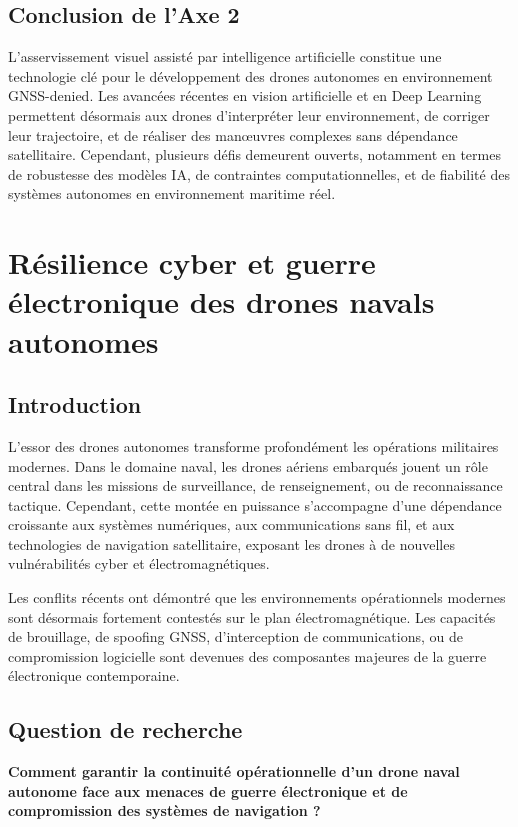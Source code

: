 \documentclass[12pt, a4paper, twoside, openright]{report}
\begin{document}
\section{Conclusion de l'Axe 2}
L’asservissement visuel assisté par intelligence artificielle constitue une technologie clé pour le développement des drones autonomes en environnement GNSS-denied. Les avancées récentes en vision artificielle et en Deep Learning permettent désormais aux drones d’interpréter leur environnement, de corriger leur trajectoire, et de réaliser des manœuvres complexes sans dépendance satellitaire. Cependant, plusieurs défis demeurent ouverts, notamment en termes de robustesse des modèles IA, de contraintes computationnelles, et de fiabilité des systèmes autonomes en environnement maritime réel.

\cleardoublepage

\chapter{Résilience cyber et guerre électronique des drones navals autonomes}\label{chap:axe3}

\section{Introduction}
L’essor des drones autonomes transforme profondément les opérations militaires modernes. Dans le domaine naval, les drones aériens embarqués jouent un rôle central dans les missions de surveillance, de renseignement, ou de reconnaissance tactique. Cependant, cette montée en puissance s’accompagne d’une dépendance croissante aux systèmes numériques, aux communications sans fil, et aux technologies de navigation satellitaire, exposant les drones à de nouvelles vulnérabilités cyber et électromagnétiques.

Les conflits récents ont démontré que les environnements opérationnels modernes sont désormais fortement contestés sur le plan électromagnétique. Les capacités de brouillage, de spoofing GNSS, d’interception de communications, ou de compromission logicielle sont devenues des composantes majeures de la guerre électronique contemporaine.

\section{Question de recherche}
\begin{framed}
    \textbf{Comment garantir la continuité opérationnelle d’un drone naval autonome face aux menaces de guerre électronique et de compromission des systèmes de navigation ?}
\end{framed}
\end{document}

